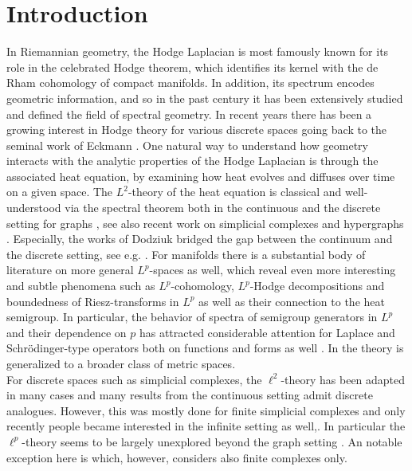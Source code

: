 \documentclass[10pt]{amsart}
\theoremstyle{definition}
\begin{document}
\section{Introduction}
In Riemannian geometry, the Hodge Laplacian is most famously known for its role in the celebrated Hodge theorem, which identifies its kernel with the de Rham cohomology of compact manifolds. In addition, its spectrum encodes geometric information, and so in the past century it has been extensively studied and defined the field of spectral geometry. In recent years there has been a growing interest in Hodge theory for various discrete spaces \cite{C,F,GrigPath,HJ,jost2026spectra,MHJ} going back to the seminal work of Eckmann \cite{Eckmann1944}. One natural way to understand how geometry interacts with the analytic properties of the Hodge Laplacian is through the associated heat equation, by examining how heat evolves and diffuses over time on a given space. The $L^2$-theory of the heat equation is classical  and well-understood via the spectral theorem both in the continuous \cite{Chavel,Dodziuk,Do83, DM97,deRham,Strichartz} and the discrete setting for graphs \cite{Barlow,BHY1,KLW,Grigoryanbook,Wojc}, see also recent work on simplicial complexes and hypergraphs \cite{HL,MugnoloHyper,MKBJ}. Especially, the works of Dodziuk bridged the gap between the continuum and the discrete setting, see e.g. \cite{Dodziuk,DM98}. For manifolds there is  a substantial body of literature on more general $L^p$-spaces \cite{CC,Ch,ChL,Magniez,Strichartz} as well, which reveal even more interesting and subtle phenomena such as $L^p$-cohomology, $L^p$-Hodge decompositions and boundedness of Riesz-transforms in $L^p$ as well as their connection to the heat semigroup. In particular, the behavior of spectra of semigroup generators in $L^p$ and their dependence on $p$ has attracted considerable attention for Laplace and Schrödinger-type operators both on functions \cite{CKK,HempelVoigt1986,HempelVoigt1987, Sturm} and forms as well \cite{Ch}. In \cite{Braun} the theory is generalized to a broader class of metric spaces.\\
For discrete spaces such as simplicial complexes, the $\ell^2$-theory has been adapted in many cases and many results from the continuous setting admit discrete analogues. However, this was mostly done for finite simplicial complexes \cite{Dodziuk,HJ} and only recently people became interested in the infinite setting as well,\cite{ATH,C,ennaceur_jadlaoui_hodge,ennaceur_jadlaoui_geometric,HL,Masamune}. In particular the $\ell^p$-theory seems to be  largely unexplored beyond the graph setting \cite{BauerHuaKeller,CHQSZ,CCH}. An notable exception here is \cite{JM} which, however, considers  also  finite complexes only.\\
\end{document}
